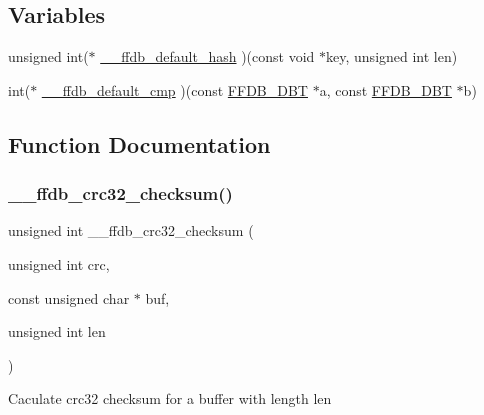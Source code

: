 \subsection*{Variables}
\begin{DoxyCompactItemize}
\item 
unsigned int($\ast$ \mbox{\hyperlink{adat-devel_2other__libs_2filedb_2filehash_2ffdb__hash__func_8h_a8dbb63e1cad3f3b74feb88774094ac90}{\+\_\+\+\_\+ffdb\+\_\+default\+\_\+hash}} )(const void $\ast$key, unsigned int len)
\item 
int($\ast$ \mbox{\hyperlink{adat-devel_2other__libs_2filedb_2filehash_2ffdb__hash__func_8h_a95a05878af50da44152ad314a956b048}{\+\_\+\+\_\+ffdb\+\_\+default\+\_\+cmp}} )(const \mbox{\hyperlink{adat-devel_2other__libs_2filedb_2filehash_2ffdb__db_8h_aa2e0984399491df0fdd20898ca8758f9}{F\+F\+D\+B\+\_\+\+D\+BT}} $\ast$a, const \mbox{\hyperlink{adat-devel_2other__libs_2filedb_2filehash_2ffdb__db_8h_aa2e0984399491df0fdd20898ca8758f9}{F\+F\+D\+B\+\_\+\+D\+BT}} $\ast$b)
\end{DoxyCompactItemize}


\subsection{Function Documentation}
\mbox{\label{adat-devel_2other__libs_2filedb_2filehash_2ffdb__hash__func_8h_afa8fcad8eecebc3b96f83a921a6c5a25}} 
\subsubsection{\texorpdfstring{\_\_ffdb\_crc32\_checksum()}{\_\_ffdb\_crc32\_checksum()}}
{\footnotesize\ttfamily unsigned int \+\_\+\+\_\+ffdb\+\_\+crc32\+\_\+checksum (\begin{DoxyParamCaption}\item[{unsigned int}]{crc,  }\item[{const unsigned char $\ast$}]{buf,  }\item[{unsigned int}]{len }\end{DoxyParamCaption})}

Caculate crc32 checksum for a buffer with length len \mbox{\label{adat-devel_2other__libs_2filedb_2filehash_2ffdb__hash__func_8h_a7dd14a868e00186dc5b316ff25f1f85e}} 
